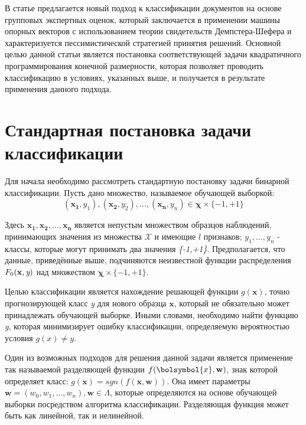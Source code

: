 \documentclass[12pt,a4paper,oneside]{article}
\begin{document}
\begin{multicols}{2}

\par
В статье предлагается новый подход к классификации документов на основе групповых экспертных оценок, который заключается в применении машины опорных векторов с использованием теории свидетельств Демпстера-Шефера и характеризуется пессимистической стратегией принятия решений. 
Основной целью данной статьи является постановка соответствующей задачи квадратичного программирования конечной размерности, которая позволяет проводить классификацию в условиях, указанных выше, и получается в результате применения данного подхода.


\vspace*{1em}
\chapter{Стандартная постановка задачи классификации}

\par
Для начала необходимо рассмотреть стандартную постановку задачи бинарной классификации.
Пусть дано множество, называемое обучающей выборкой:
\[
(\mathbf{x_1}, y_1),(\mathbf{x_2}, y_2), \dots, (\mathbf{x_n}, y_n) \in \mathbf{\chi} \times \{-1,+1\}
\]

\par
Здесь \(\mathbf{x_1}, \mathbf{x_2}, \dots, \mathbf{x_n}\) является непустым множеством образцов наблюдений, принимающих значения из множества \(\mathcal{X}\) и имеющие $l$ признаков; \(y_1, \dots, y_n\) - классы, которые могут принимать два значения \emph{\{-1,+1\}}. 
Предполагается, что данные, приведённые выше, подчиняются неизвестной функции распределения \(F_0(\mathbf{x}, \emph{y})\) над множеством \(\mathbf{\chi} \times \{-1, +1\}\). 

\par
Целью классификации является нахождение решающей функции \(g(\mathbf{x})\), точно прогнозирующей класс \emph{y} для нового образца \(\mathbf{x}\), который не обязательно может принадлежать обучающей выборке. 
Иными словами, необходимо найти функцию \emph{g}, которая минимизирует ошибку классификации, определяемую вероятностью условия \(g(x) \neq y\). 

\par
Один из возможных подходов для решения данной задачи является применение так называемой разделяющей функции \(f(\bolsymbol{x}, \mathbf{w})\), знак которой определяет класс: \(g(\mathbf{x})=sgn(f(\mathbf{x}, \mathbf{w}))\).
Она имеет параметры \(\mathbf{w}=(w_0, w_1, \dots, w_n), \mathbf{w} \in \Lambda\), которые определяются на основе обучающей выборки посредством алгоритма классификации. 
Разделяющая функция может быть как линейной, так и нелинейной.


\end{multicols}
\end{document}
